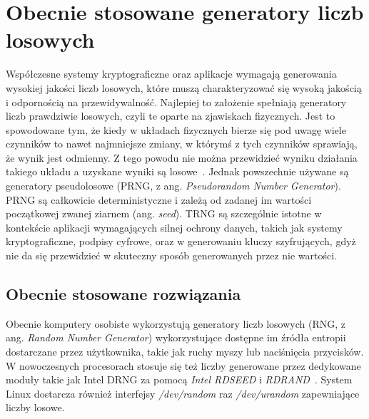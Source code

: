 \chapter{Obecnie stosowane generatory liczb losowych}\label{ch:przeglad-rynku}

Współczesne systemy kryptograficzne oraz aplikacje wymagają generowania wysokiej jakości liczb losowych,
które muszą charakteryzować się wysoką jakością i odpornością na przewidywalność.
Najlepiej to założenie spełniają generatory liczb prawdziwie losowych, czyli te oparte na zjawiskach fizycznych.
Jest to spowodowane tym, że kiedy w układach fizycznych bierze się pod uwagę wiele czynników to nawet najmniejsze zmiany,
w którymś z tych czynników sprawiają, że wynik jest odmienny.
Z tego powodu nie można przewidzieć wyniku działania takiego układu a uzyskane wyniki są losowe~\cite{chaos}.
Jednak powszechnie używane są generatory pseudolosowe (PRNG, z ang. \textit{Pseudorandom Number Generator}).
PRNG są całkowicie deterministyczne i zależą od zadanej im wartości początkowej zwanej ziarnem (ang. \textit{seed}).
TRNG są szczególnie istotne w kontekście aplikacji wymagających silnej ochrony danych,
takich jak systemy kryptograficzne, podpisy cyfrowe, oraz w generowaniu kluczy szyfrujących,
gdyż nie da się przewidzieć w skuteczny sposób generowanych przez nie wartości.

\section{Obecnie stosowane rozwiązania}\label{sec:obecnie-stosowane-rozwiazania}

Obecnie komputery osobiste wykorzystują generatory liczb losowych (RNG, z ang. \textit{Random Number Generator})
wykorzystujące dostępne im źródła entropii dostarczane przez użytkownika, takie jak ruchy myszy lub naciśnięcia przycisków.
W nowoczesnych procesorach stosuje się też liczby generowane przez dedykowane moduły takie jak Intel DRNG za pomocą \textit{Intel RDSEED} i \textit{RDRAND}~\cite{IntelRD}.
System Linux dostarcza również interfejsy \textit{/dev/random} raz \textit{/dev/urandom} zapewniające liczby losowe.



